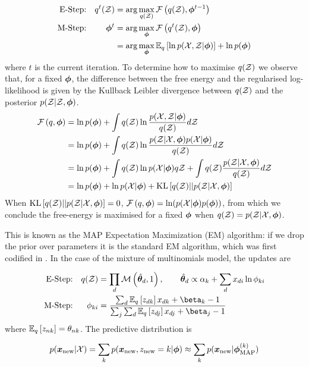 \begin{align*}
\text{E-Step:} & & q^t(\zdat) & = \arg \max_{q(\zdat)} \fqt{q(\zdat), \param^{t-1}} \\
\text{M-Step:} & & \param^t & = \arg \max_{\param} \fqt{q^t(\zdat), \param} \\
& & & = \arg \max_{\param} \exlogjoint{q} + \ln p(\param)
\end{align*}
where $t$ is the current iteration. To determine how to maximise $q(\zdat)$ we observe that, for a fixed $\param$, the difference between the free energy and the regularised log-likelihood is given by the Kullback Leibler divergence between $q(\zdat)$ and the posterior $p(\zdat|\zdat, \param)$.
\begin{align*}
\fqt{q, \param} 
& = \ln p(\param) + \int q(\zdat) \ln \frac{p(\xdat, \zdat|\param)}{q(\zdat)} d\zdat \\
& = \ln p(\param) + \int q(\zdat) \ln \frac{p(\zdat|\xdat, \param)p(\xdat | \param)}{q(\zdat)} d\zdat \\
& = \ln p(\param) + \int q(\zdat) \ln p(\xdat | \param) q\zdat + \int q(\zdat)\frac{p(\zdat|\xdat, \param)}{q(\zdat)} d\zdat \\
& = \ln p(\param) + \ln p(\xdat | \param) + \kl{q(\zdat)}{p(\zdat|\xdat, \param)}
\end{align*}
When $\kl{q(\zdat)}{p(\zdat|\xdat, \param)} = 0$, $\fqt{q, \param} = \ln(p(\xdat | \param)p(\param))$, from which we conclude the free-energy is maximised for a fixed $\param$ when $q(\zdat) = p(\zdat | \xdat, \param)$.

This is known as the MAP Expectation Maximization (EM) algorithm: if we drop the prior over parameters it is the standard EM algorithm, which was first codified in \cite{Dempster1977}. In the case of the mixture of multinomials model, the updates are

\begin{align*}
\text{E-Step:} & & q(\zdat) & = \prod_d \muln{\hat{\vv{\theta}}_d}{1}, \qquad
\hat{\vv{\theta}}_d \propto  \alpha_k + \sum_d x_{di} \ln \phi_{ki}  \\
\text{M-Step:} & & \phi_{ki} & = \frac{\sum_d \ex{z_{dk}}{q} x_{dk} + \beta_k - 1}{\sum_j \sum_d \ex{z_{dj}}{q} x_{dj} + \beta_j - 1}
\end{align*}
where $\ex{z_{nk}}{q} = \theta_{nk}$. The predictive distribution is

\begin{align*}
p(\xnew | \xdat)  = \sum_k p(\xnew, z_{\text{new}} = k | \param) 
\approx \sum_k p(\xnew | \param^{(k)}_{\text{MAP}})
\end{align*}

